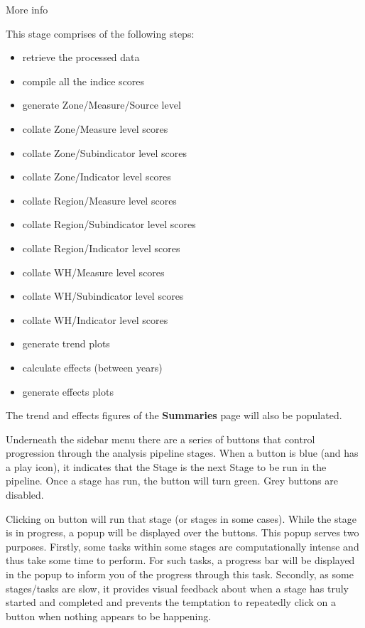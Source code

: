 \documentclass[
  8pt,
  a4paper]{article}
\providecommand{\tightlist}{%
  \setlength{\itemsep}{0pt}\setlength{\parskip}{0pt}}
\begin{document}
\begin{itemize}
  More info

  This stage comprises of the following steps:

  \begin{itemize}
  \tightlist
  \item
    retrieve the processed data
  \item
    compile all the indice scores
  \item
    generate Zone/Measure/Source level
  \item
    collate Zone/Measure level scores
  \item
    collate Zone/Subindicator level scores
  \item
    collate Zone/Indicator level scores
  \item
    collate Region/Measure level scores
  \item
    collate Region/Subindicator level scores
  \item
    collate Region/Indicator level scores
  \item
    collate WH/Measure level scores
  \item
    collate WH/Subindicator level scores
  \item
    collate WH/Indicator level scores
  \item
    generate trend plots
  \item
    calculate effects (between years)
  \item
    generate effects plots
  \end{itemize}

  The trend and effects figures of the \textbf{Summaries} page will also
  be populated.
\end{itemize}

Underneath the sidebar menu there are a series of buttons that control
progression through the analysis pipeline stages. When a button is blue
(and has a play icon), it indicates that the Stage is the next Stage to
be run in the pipeline. Once a stage has run, the button will turn
green. Grey buttons are disabled.

Clicking on button will run that stage (or stages in some cases). While
the stage is in progress, a popup will be displayed over the buttons.
This popup serves two purposes. Firstly, some tasks within some stages
are computationally intense and thus take some time to perform. For such
tasks, a progress bar will be displayed in the popup to inform you of
the progress through this task. Secondly, as some stages/tasks are slow,
it provides visual feedback about when a stage has truly started and
completed and prevents the temptation to repeatedly click on a button
when nothing appears to be happening.
\end{document}
